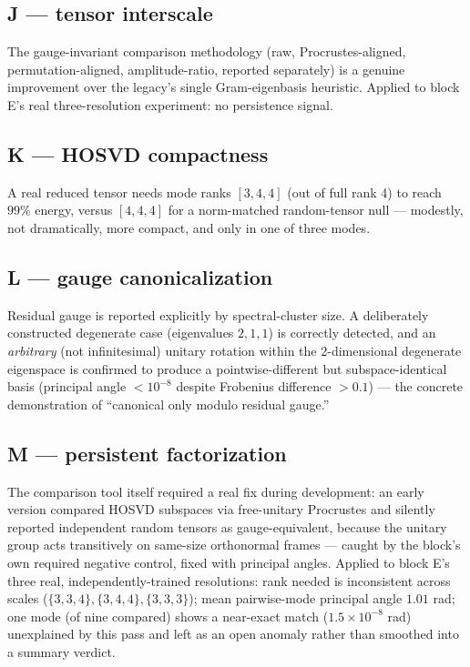 \documentclass[11pt]{amsart}
\begin{document}
\subsection{J --- tensor interscale}
The gauge-invariant comparison methodology (raw, Procrustes-aligned,
permutation-aligned, amplitude-ratio, reported separately) is a genuine
improvement over the legacy's single Gram-eigenbasis heuristic. Applied
to block E's real three-resolution experiment: no persistence signal.

\subsection{K --- HOSVD compactness}
A real reduced tensor needs mode ranks $[3,4,4]$ (out of full rank 4) to
reach $99\%$ energy, versus $[4,4,4]$ for a norm-matched random-tensor
null --- modestly, not dramatically, more compact, and only in one of
three modes.

\subsection{L --- gauge canonicalization}
Residual gauge is reported explicitly by spectral-cluster size. A
deliberately constructed degenerate case (eigenvalues $2,1,1$) is
correctly detected, and an \emph{arbitrary} (not infinitesimal) unitary
rotation within the 2-dimensional degenerate eigenspace is confirmed to
produce a pointwise-different but subspace-identical basis (principal
angle $<10^{-8}$ despite Frobenius difference $>0.1$) --- the concrete
demonstration of ``canonical only modulo residual gauge.''

\subsection{M --- persistent factorization}
The comparison tool itself required a real fix during development: an
early version compared HOSVD subspaces via free-unitary Procrustes and
silently reported independent random tensors as gauge-equivalent, because
the unitary group acts transitively on same-size orthonormal frames ---
caught by the block's own required negative control, fixed with principal
angles. Applied to block E's three real, independently-trained
resolutions: rank needed is inconsistent across scales
($\{3,3,4\},\{3,4,4\},\{3,3,3\}$); mean pairwise-mode principal angle
$1.01$ rad; one mode (of nine compared) shows a near-exact match
($1.5\times10^{-8}$ rad) unexplained by this pass and left as an open
anomaly rather than smoothed into a summary verdict.
\end{document}
